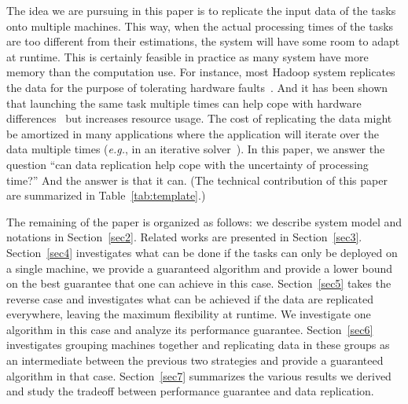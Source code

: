 \documentclass[10pt, conference, compsocconf]{IEEEtran}
\begin{document}
The idea we are pursuing in this paper is to replicate the input data
of the tasks onto multiple machines. This way, when the actual
processing times of the tasks are too different from their
estimations, the system will have some room to adapt at runtime. This
is certainly feasible in practice as many system have more memory than
the computation use. For instance, most Hadoop system replicates the
data for the purpose of tolerating hardware
faults~\cite{White:2009:HDG:1717298}. And it has been shown that
launching the same task multiple times can help cope with hardware
differences~\cite{DBLP:journals/corr/WangJW14} but increases resource
usage. The cost of replicating the data might be amortized in many
applications where the application will iterate over the data
multiple times ({\em e.g.}, in an iterative solver~\cite{Zhou12-P2S2,Zhou12-Cluster}). In this paper, we
answer the question ``can data replication help cope with the
uncertainty of processing time?''  And the answer is that it can. (The technical contribution of this paper are summarized in Table~\ref{tab:template}.)

The remaining of the paper is organized as follows: we describe system
model and notations in Section~\ref{sec2}. Related works are presented
in Section~\ref{sec3}.  Section~\ref{sec4} investigates what can be
done if the tasks can only be deployed on a single machine, we
provide a guaranteed algorithm and provide a lower bound on the best
guarantee that one can achieve in this case. Section~\ref{sec5} takes
the reverse case and investigates what can be achieved if the data are
replicated everywhere, leaving the maximum flexibility at runtime. We
investigate one algorithm in this case and analyze its performance
guarantee. Section~\ref{sec6} investigates grouping machines
together and replicating data in these groups as an intermediate
between the previous two strategies and provide a guaranteed algorithm
in that case. Section~\ref{sec7} summarizes the various results we
derived and study the tradeoff between performance guarantee and data
replication.
\end{document}
